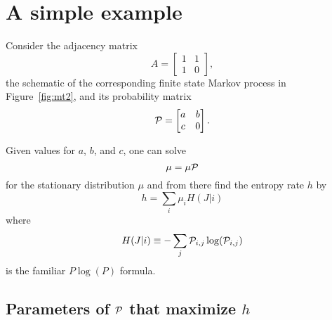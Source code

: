 \documentclass[12pt]{article} \usepackage{amsmath,amsfonts}
\newcommand{\T}{{\cal P}}
\begin{document}
\newpage
\section{A simple example}
\label{sec:example}

Consider the adjacency matrix
\begin{equation}
  \label{eq:A}
  A = \begin{bmatrix} 1 & 1 \\ 1 & 0 \end{bmatrix},
\end{equation}
the schematic of the corresponding finite state Markov process in
Figure~\ref{fig:mt2}, and its probability matrix
\begin{equation}
  \label{eq:T}
  \T = \begin{bmatrix} a & b \\ c & 0 \end{bmatrix}.
\end{equation}

\begin{figure*}
  \centering
  \resizebox{0.4\textwidth}{!}{ }
  \caption{A schematic of the finite state Markov process specified by
  Equation~\eqref{eq:T}.}
  \label{fig:mt2}
\end{figure*}

Given values for $a$, $b$, and $c$, one can solve
\begin{equation}
  \label{eq:stationary_2}
  \mu = \mu \T
\end{equation}
for the stationary distribution $\mu$ and from there find the entropy
rate $h$ by
\begin{equation}
  \label{eq:rate}
  h = \sum_i \mu_i H(J|i)
\end{equation}
where
\begin{equation*}
  H(J|i) \equiv -\sum_j \T_{i,j} \log (\T_{i,j})
\end{equation*}
is the familiar $P\log(P)$ formula.

\subsection{Parameters of $\T$ that maximize $h$}
\label{sec:max}
\end{document}

